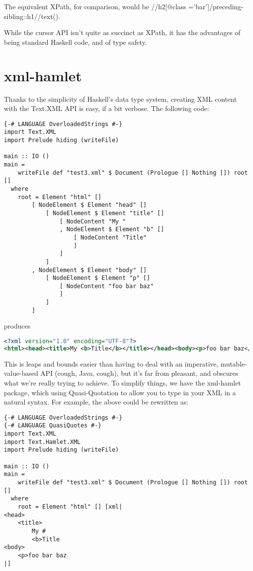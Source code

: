 \begin{remark}
The equivalent XPath, for comparison, would be //h2[@class ='bar']/preceding-sibling::h1//text().
\end{remark}

While the cursor API isn't quite as succinct as XPath, it has the advantages of being standard Haskell code, and of type safety.

\section{xml-hamlet}

Thanks to the simplicity of Haskell's data type system, creating XML content with the Text.XML API is easy, if a bit verbose. The following code:

\begin{lstlisting}
{-# LANGUAGE OverloadedStrings #-}
import Text.XML
import Prelude hiding (writeFile)

main :: IO ()
main =
    writeFile def "test3.xml" $ Document (Prologue [] Nothing []) root []
  where
    root = Element "html" []
        [ NodeElement $ Element "head" []
            [ NodeElement $ Element "title" []
                [ NodeContent "My "
                , NodeElement $ Element "b" []
                    [ NodeContent "Title"
                    ]
                ]
            ]
        , NodeElement $ Element "body" []
            [ NodeElement $ Element "p" []
                [ NodeContent "foo bar baz"
                ]
            ]
        ]
\end{lstlisting}

produces

\begin{lstlisting}[language=XML]
<?xml version="1.0" encoding="UTF-8"?>
<html><head><title>My <b>Title</b></title></head><body><p>foo bar baz</p></body></html>
\end{lstlisting}

This is leaps and bounds easier than having to deal with an imperative, mutable-value-based API (cough, Java, cough), but it's far from pleasant, and obscures what we're really trying to achieve. To simplify things, we have the xml-hamlet package, which using Quasi-Quotation to allow you to type in your XML in a natural syntax. For example, the above could be rewritten as:

\begin{lstlisting}
{-# LANGUAGE OverloadedStrings #-}
{-# LANGUAGE QuasiQuotes #-}
import Text.XML
import Text.Hamlet.XML
import Prelude hiding (writeFile)

main :: IO ()
main =
    writeFile def "test3.xml" $ Document (Prologue [] Nothing []) root []
  where
    root = Element "html" [] [xml|
<head>
    <title>
        My #
        <b>Title
<body>
    <p>foo bar baz
|]
\end{lstlisting}%


